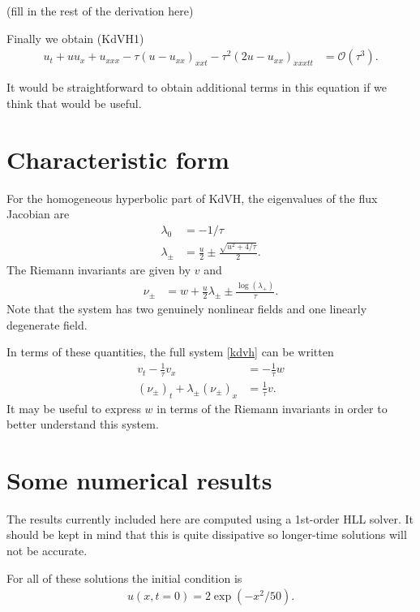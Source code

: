 \documentclass{article}
\newcommand{\order}{{\mathcal O}}
\begin{document}
(fill in the rest of the derivation here)

Finally we obtain (KdVH1)
\begin{align} \label{kdvh1}
    u_t + u u_x + u_{xxx} - \tau\left(u-u_{xx}  \right)_{xxt} - \tau^2\left(2u-u_{xx}\right)_{xxxtt} & = \order(\tau^3).
\end{align}

It would be straightforward to obtain additional terms in this equation if we think that would
be useful.

\section{Characteristic form}
For the homogeneous hyperbolic part of KdVH, the eigenvalues of the flux Jacobian are
\begin{align}
    \lambda_0 & = -1/\tau \\
    \lambda_\pm & = \frac{u}{2} \pm \frac{\sqrt{u^2 +4/\tau}}{2}.
\end{align}
The Riemann invariants are given by $v$ and
\begin{align}
\nu_\pm & = w + \frac{u}{2} \lambda_\pm \pm \frac{\log(\lambda_+)}{\tau}.
\end{align}
Note that the system has two genuinely nonlinear fields and one linearly
degenerate field.

In terms of these quantities, the full system \eqref{kdvh} can be written
\begin{subequations}
\begin{align}
    v_t - \frac{1}{\tau} v_x & = -\frac{1}{\tau} w \\
    (\nu_\pm)_t + \lambda_\pm (\nu_\pm)_x & = \frac{1}{\tau} v.
\end{align}
\end{subequations}
It may be useful to express $w$ in terms of the Riemann invariants
in order to better understand this system.

\section{Some numerical results}

The results currently included here are computed using a 1st-order HLL solver.  It should be
kept in mind that this is quite dissipative so longer-time solutions will not be accurate.

For all of these solutions the initial condition is
\begin{align}
    u(x,t=0) = 2 \exp(-x^2/50).
\end{align}
\end{document}
